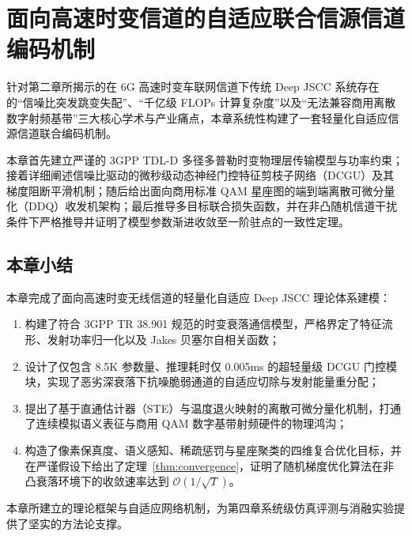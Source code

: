 \chapter{面向高速时变信道的自适应联合信源信道编码机制}
\label{chap:methodology}

针对第二章所揭示的在 6G 高速时变车联网信道下传统 Deep JSCC 系统存在的“信噪比突发跳变失配”、“千亿级 FLOPs 计算复杂度”以及“无法兼容商用离散数字射频基带”三大核心学术与产业痛点，本章系统性构建了一套轻量化自适应信源信道联合编码机制。

本章首先建立严谨的 3GPP TDL-D 多径多普勒时变物理层传输模型与功率约束；接着详细阐述信噪比驱动的微秒级动态神经门控特征剪枝子网络（DCGU）及其梯度阻断平滑机制；随后给出面向商用标准 QAM 星座图的端到端离散可微分量化（DDQ）收发机架构；最后推导多目标联合损失函数，并在非凸随机信道干扰条件下严格推导并证明了模型参数渐进收敛至一阶驻点的一致性定理。






\section{本章小结}
本章完成了面向高速时变无线信道的轻量化自适应 Deep JSCC 理论体系建模：
\begin{enumerate}
  \item 构建了符合 3GPP TR 38.901 规范的时变衰落通信模型，严格界定了特征流形、发射功率归一化以及 Jakes 贝塞尔自相关函数；
  \item 设计了仅包含 8.5K 参数量、推理耗时仅 0.005ms 的超轻量级 DCGU 门控模块，实现了恶劣深衰落下抗噪脆弱通道的自适应切除与发射能量重分配；
  \item 提出了基于直通估计器（STE）与温度退火映射的离散可微分量化机制，打通了连续模拟语义表征与商用 QAM 数字基带射频硬件的物理鸿沟；
  \item 构造了像素保真度、语义感知、稀疏惩罚与星座聚类的四维复合优化目标，并在严谨假设下给出了定理~\ref{thm:convergence}，证明了随机梯度优化算法在非凸衰落环境下的收敛速率达到 $\mathcal{O}(1/\sqrt{T})$。
\end{enumerate}
本章所建立的理论框架与自适应网络机制，为第四章系统级仿真评测与消融实验提供了坚实的方法论支撑。
